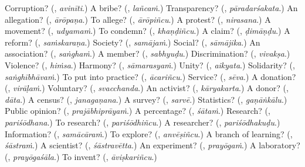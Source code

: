 \begin{tcolorbox}[breakable,colback=teal!4,colframe=teal!35!black,title={Before you move on}]
Corruption? (\textbf{}, \emph{avinīti}.) A bribe? (\textbf{}, \emph{lañcaṁ}.) Transparency? (\textbf{}, \emph{pāradarśakata}.) An allegation? (\textbf{}, \emph{ārōpaṇa}.) To allege? (\textbf{}, \emph{ārōpiñcu}.) A protest? (\textbf{}, \emph{nirasana}.) A movement? (\textbf{}, \emph{udyamaṁ}.) To condemn? (\textbf{}, \emph{khaṇḍiñcu}.) A claim? (\textbf{}, \emph{ḍimāṇḍu}.) A reform? (\textbf{}, \emph{saṁskaraṇa}.) Society? (\textbf{}, \emph{samājaṁ}.) Social? (\textbf{}, \emph{sāmājika}.) An association? (\textbf{}, \emph{saṅghaṁ}.) A member? (\textbf{}, \emph{sabhyuḍu}.) Discrimination? (\textbf{}, \emph{vivakṣa}.) Violence? (\textbf{}, \emph{hiṁsa}.) Harmony? (\textbf{}, \emph{sāmarasyaṁ}.) Unity? (\textbf{}, \emph{aikyata}.) Solidarity? (\textbf{}, \emph{saṅghībhāvaṁ}.) To put into practice? (\textbf{}, \emph{ācariñcu}.) Service? (\textbf{}, \emph{sēva}.) A donation? (\textbf{}, \emph{virāḷaṁ}.) Voluntary? (\textbf{}, \emph{svacchanda}.) An activist? (\textbf{}, \emph{kāryakarta}.) A donor? (\textbf{}, \emph{dāta}.) A census? (\textbf{}, \emph{janagaṇana}.) A survey? (\textbf{}, \emph{sarvē}.) Statistics? (\textbf{}, \emph{gaṇāṅkālu}.) Public opinion? (\textbf{}, \emph{prajābhiprāyaṁ}.) A percentage? (\textbf{}, \emph{śātaṁ}.) Research? (\textbf{}, \emph{pariśōdhana}.) To research? (\textbf{}, \emph{pariśōdhiñcu}.) A researcher? (\textbf{}, \emph{pariśōdhakuḍu}.) Information? (\textbf{}, \emph{samācāraṁ}.) To explore? (\textbf{}, \emph{anvēṣiñcu}.) A branch of learning? (\textbf{}, \emph{śāstraṁ}.) A scientist? (\textbf{}, \emph{śāstravētta}.) An experiment? (\textbf{}, \emph{prayōgaṁ}.) A laboratory? (\textbf{}, \emph{prayōgaśāla}.) To invent? (\textbf{}, \emph{āviṣkariñcu}.)
\end{tcolorbox}
